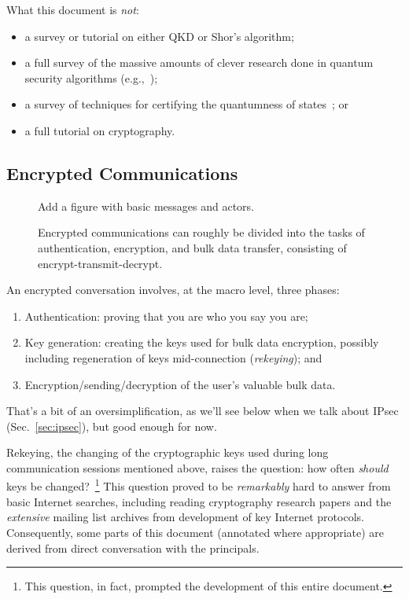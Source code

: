What this document is \emph{not}:

\begin{itemize}
\item a survey or tutorial on either QKD or Shor's algorithm;
\item a full survey of the massive amounts of clever research done in
  quantum security algorithms
  (e.g.,~\cite{PhysRevA.100.052326,buhrman14:_posit_based_quant_crypt,ben-or2005fast,Crepeau:2002:SMQ:509907.510000});
\item a survey of techniques for certifying the quantumness of states~\cite{eisert2019cert}; or
\item a full tutorial on cryptography.
\end{itemize}

\subsection{Encrypted Communications}

\begin{figure}
  {\color{Magenta} Add a figure with basic messages and actors.}
  \caption{Encrypted communications can roughly be divided into the
    tasks of authentication, encryption, and bulk data transfer,
    consisting of encrypt-transmit-decrypt.}
  \label{fig:encrypted-comm}
\end{figure}

An encrypted conversation involves, at the macro level, three phases:

\begin{enumerate}
\item Authentication: proving that you are who you say you are;
\item Key generation: creating the keys used for bulk data encryption,
  possibly including regeneration of keys mid-connection
  (\emph{rekeying}); and
\item Encryption/sending/decryption of the user's valuable bulk data.
\end{enumerate}

That's a bit of an oversimplification, as we'll see below when we talk
about IPsec (Sec.~\ref{sec:ipsec}), but good enough for now.

Rekeying, the changing of the cryptographic keys used during long
communication sessions mentioned above, raises the question: how often
\emph{should} keys be changed?~\footnote{This question, in fact,
  prompted the development of this entire document.}  This question
proved to be \emph{remarkably} hard to answer from basic Internet
searches, including reading cryptography research papers and the
\emph{extensive} mailing list archives from development of key
Internet protocols.  Consequently, some parts of this document
(annotated where appropriate) are derived from direct conversation
with the principals.

